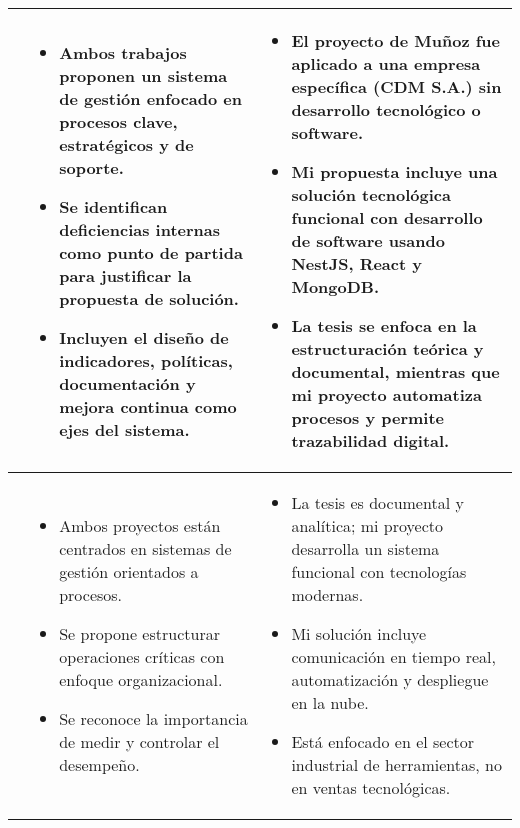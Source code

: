 \begin{longtable}{m{.05\paperwidth} *{2}{m{.33\paperwidth}} @{}}
\cite{Munoz2018} &
\begin{itemize}[topsep=0pt,itemsep=0pt,parsep=0pt,partopsep=0pt,leftmargin=*]
	\item Ambos trabajos proponen un sistema de gestión enfocado en procesos clave, estratégicos y de soporte.
	\item Se identifican deficiencias internas como punto de partida para justificar la propuesta de solución.
	\item Incluyen el diseño de indicadores, políticas, documentación y mejora continua como ejes del sistema.
\end{itemize} &
\begin{itemize}[topsep=0pt,itemsep=0pt,parsep=0pt,partopsep=0pt,leftmargin=*]
	\item El proyecto de Muñoz fue aplicado a una empresa específica (CDM S.A.) sin desarrollo tecnológico o software.
	\item Mi propuesta incluye una solución tecnológica funcional con desarrollo de software usando NestJS, React y MongoDB.
	\item La tesis se enfoca en la estructuración teórica y documental, mientras que mi proyecto automatiza procesos y permite trazabilidad digital.
\end{itemize} \\
\midrule

\cite{Jacome2016} &
\begin{itemize}[topsep=0pt,itemsep=0pt,parsep=0pt,partopsep=0pt,leftmargin=*]
	\item Ambos proyectos están centrados en sistemas de gestión orientados a procesos.
	\item Se propone estructurar operaciones críticas con enfoque organizacional.
	\item Se reconoce la importancia de medir y controlar el desempeño.
\end{itemize} &
\begin{itemize}[topsep=0pt,itemsep=0pt,parsep=0pt,partopsep=0pt,leftmargin=*]
	\item La tesis es documental y analítica; mi proyecto desarrolla un sistema funcional con tecnologías modernas.
	\item Mi solución incluye comunicación en tiempo real, automatización y despliegue en la nube.
	\item Está enfocado en el sector industrial de herramientas, no en ventas tecnológicas.
\end{itemize} \\
\midrule


\end{longtable}
